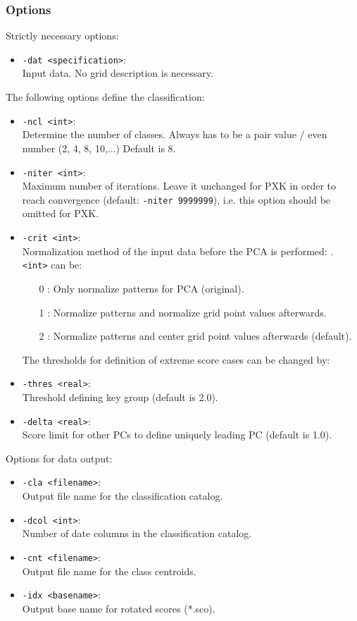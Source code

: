 \documentclass[12pt, oneside, a4paper, headsepline, plainheadsepline]{scrbook}
\begin{document}
\subsubsection*{Options}
Strictly necessary options:
\begin{itemize}
 \item \verb+-dat <specification>+:\\ Input data. No grid description is necessary.
\end{itemize}
The following options define the classification:
\begin{itemize}
 \item \verb+-ncl <int>+:\\ Determine the number of classes.  Always has to be a pair value / even number (2, 4, 8, 10,...) Default is 8.
\item \verb+-niter <int>+:\\ Maximum number of iterations. Leave it unchanged for PXK in order to reach convergence (default: \verb+-niter 9999999+), i.e. this option should be omitted for PXK. 
\item \verb+-crit <int>+:\\ Normalization method of the input data before the PCA is performed: . \verb+<int>+ can be:
 \begin{itemize}
  \item[0]: Only normalize patterns for PCA (original).
  \item[1]: Normalize patterns and normalize grid point values afterwards.
  \item[2]: Normalize patterns and center grid point values afterwards (default).
 \end{itemize}
The thresholds for definition of extreme score cases can be changed by:
\item \verb+-thres <real>+: \\
	Threshold defining key group (default is 2.0).
\item \verb+-delta <real>+: \\
	Score limit for other PCs to define uniquely leading PC (default is 1.0).
\end{itemize}
Options for data output:
\begin{itemize}
 \item \verb+-cla <filename>+:\\ Output file name for the classification catalog.
 \item \verb+-dcol <int>+:\\ Number of date columns in the classification catalog.
 \item \verb+-cnt <filename>+:\\ Output file name for the class centroids.
 \item \verb+-idx <basename>+:\\ Output base name for rotated scores (*.sco).
\end{itemize}
\end{document}
